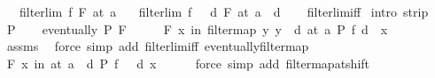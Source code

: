 \begin{isabellebody}
\ \ \ {\isachardoublequoteopen}filterlim\ f\ F\ {\isacharparenleft}{\kern0pt}at\ a{\isacharparenright}{\kern0pt}{\isachardoublequoteclose}\isanewline
\ \ \ {\isachardoublequoteopen}filterlim\ {\isacharparenleft}{\kern0pt}f\ {\isasymcirc}\ {\isacharparenleft}{\kern0pt}{\isacharplus}{\kern0pt}{\isacharparenright}{\kern0pt}\ d{\isacharparenright}{\kern0pt}\ F\ {\isacharparenleft}{\kern0pt}at\ {\isacharparenleft}{\kern0pt}a\ {\isacharminus}{\kern0pt}\ d{\isacharparenright}{\kern0pt}{\isacharparenright}{\kern0pt}{\isachardoublequoteclose}\isanewline
%
\isadelimproof
\ \ %
\endisadelimproof
%
\isatagproof
{}\isamarkupfalse%
\ filterlim{\isacharunderscore}{\kern0pt}iff\isanewline
{}\isamarkupfalse%
\ {\isacharparenleft}{\kern0pt}intro\ strip{\isacharparenright}{\kern0pt}\isanewline
\ \ \isamarkupfalse%
\ P\isanewline
\ \ \isamarkupfalse%
\ {\isachardoublequoteopen}eventually\ P\ F{\isachardoublequoteclose}\isanewline
\ \ \isamarkupfalse%
\ \isamarkupfalse%
\ {\isachardoublequoteopen}{\isasymforall}\isactrlsub F\ x\ in\ filtermap\ {\isacharparenleft}{\kern0pt}{\isasymlambda}y{\isachardot}{\kern0pt}\ y\ {\isacharminus}{\kern0pt}\ d{\isacharparenright}{\kern0pt}\ {\isacharparenleft}{\kern0pt}at\ a{\isacharparenright}{\kern0pt}{\isachardot}{\kern0pt}\ P\ {\isacharparenleft}{\kern0pt}f\ {\isacharparenleft}{\kern0pt}d\ {\isacharplus}{\kern0pt}\ x{\isacharparenright}{\kern0pt}{\isacharparenright}{\kern0pt}{\isachardoublequoteclose}\isanewline
\ \ \ \ \isamarkupfalse%
\ assms\ \isamarkupfalse%
\ {\isacharparenleft}{\kern0pt}force\ simp\ add{\isacharcolon}{\kern0pt}\ filterlim{\isacharunderscore}{\kern0pt}iff\ eventually{\isacharunderscore}{\kern0pt}filtermap{\isacharparenright}{\kern0pt}\isanewline
\ \ \isamarkupfalse%
\ \isamarkupfalse%
\ {\isachardoublequoteopen}{\isacharparenleft}{\kern0pt}{\isasymforall}\isactrlsub F\ x\ in\ at\ {\isacharparenleft}{\kern0pt}a\ {\isacharminus}{\kern0pt}\ d{\isacharparenright}{\kern0pt}{\isachardot}{\kern0pt}\ P\ {\isacharparenleft}{\kern0pt}{\isacharparenleft}{\kern0pt}f\ {\isasymcirc}\ {\isacharparenleft}{\kern0pt}{\isacharplus}{\kern0pt}{\isacharparenright}{\kern0pt}\ d{\isacharparenright}{\kern0pt}\ x{\isacharparenright}{\kern0pt}{\isacharparenright}{\kern0pt}{\isachardoublequoteclose}\isanewline
\ \ \ \ \isamarkupfalse%
\ {\isacharparenleft}{\kern0pt}force\ simp\ add{\isacharcolon}{\kern0pt}\ filtermap{\isacharunderscore}{\kern0pt}at{\isacharunderscore}{\kern0pt}shift{\isacharparenright}{\kern0pt}\isanewline

\end{isabellebody}
